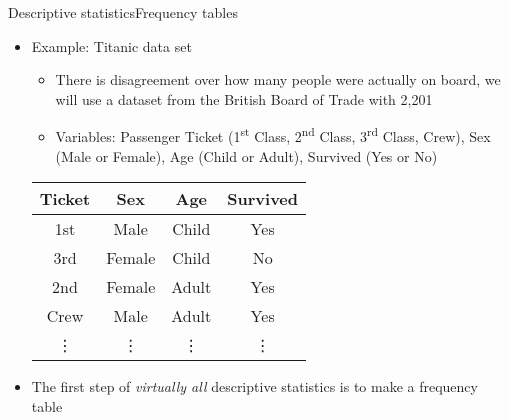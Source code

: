 \documentclass[xcolor=dvipsnames]{beamer}
\begin{document}
\begin{frame}{Descriptive statistics}{Frequency tables}
	\begin{itemize}
		\item Example: Titanic data set
		\begin{itemize}
			\item There is disagreement over how many people were actually on board, we will use a dataset from the British Board of Trade with 2,201
			\item Variables: Passenger Ticket (1\textsuperscript{st} Class, 2\textsuperscript{nd} Class, 3\textsuperscript{rd} Class, Crew), Sex (Male or Female), Age (Child or Adult), Survived (Yes or No)
		\end{itemize}
	\begin{center}
				\begin{tabular}{|c|c|c|c|}
			\hline 
			\textbf{Ticket} & \textbf{Sex} & \textbf{Age} & \textbf{Survived}  \\ 
			\hline \hline
			1st & Male & Child & Yes \\ 
			\hline 
			3rd & Female & Child & No \\ 
			\hline 
			2nd & Female & Adult & Yes \\ 
			\hline 
			Crew & Male & Adult & Yes \\ 
			\hline
			\vdots & \vdots & \vdots & \vdots \\
			\hline 
		\end{tabular} 
	\end{center}
		\item The first step of \emph{virtually all} descriptive statistics is to make a frequency table
	\end{itemize}
\end{frame}
\end{document}

